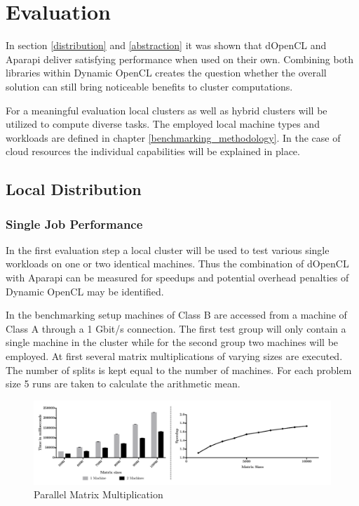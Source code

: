 \chapter{Evaluation}

In section \ref{distribution} and \ref{abstraction} it was shown that dOpenCL and Aparapi deliver satisfying performance when used on their own. Combining both libraries within Dynamic OpenCL creates the question whether the overall solution can still bring noticeable benefits to cluster computations.

For a meaningful evaluation local clusters as well as hybrid clusters will be utilized to compute diverse tasks. The employed local machine types and workloads are defined in chapter \ref{benchmarking_methodology}. In the case of cloud resources the individual capabilities will be explained in place.

\section{Local Distribution}
\label{local_distribution}
\subsection{Single Job Performance}
\label{single_job_performance}
In the first evaluation step a local cluster will be used to test various single workloads on one or two identical machines. Thus the combination of dOpenCL with Aparapi can be measured for speedups and potential overhead penalties of Dynamic OpenCL may be identified.

In the benchmarking setup machines of Class B are accessed from a machine of Class A through a 1 Gbit/s connection. The first test group will only contain a single machine in the cluster while for the second group two machines will be employed. At first several matrix multiplications of varying sizes are executed. The number of splits is kept equal to the number of machines. For each problem size 5 runs are taken to calculate the arithmetic mean.

\begin{figure}[H]
	
	\includegraphics[width=1.0\textwidth]{images/sharded_matrix_multi.pdf}
	\centering
	\caption{Parallel Matrix Multiplication}
	\label{img:parallel_matrix}
\end{figure}

